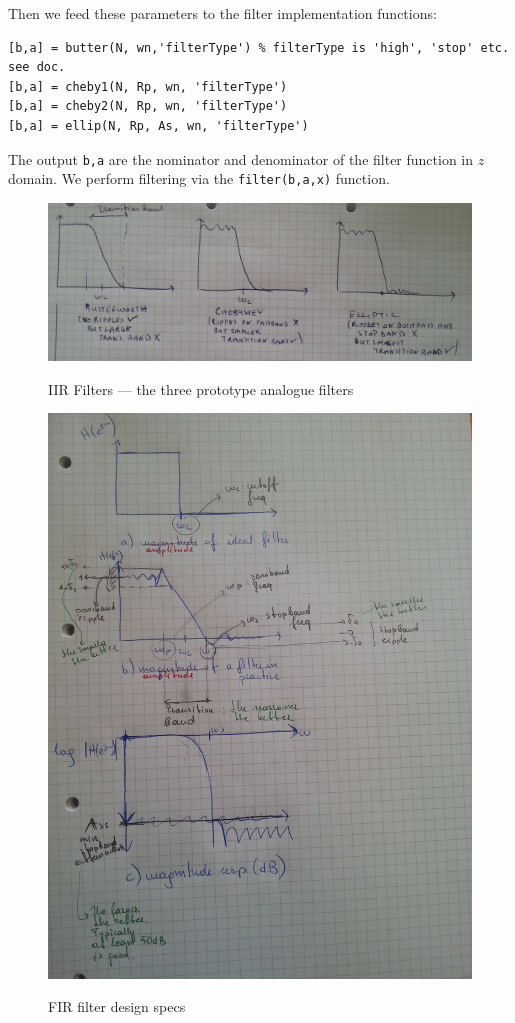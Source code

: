 \documentclass{article}
\newcommand{\ttt}[1]{\texttt{#1}}
\begin{document}
Then we feed these parameters to the filter implementation functions:
\begin{verbatim}
[b,a] = butter(N, wn,'filterType') % filterType is 'high', 'stop' etc. see doc.
[b,a] = cheby1(N, Rp, wn, 'filterType')
[b,a] = cheby2(N, Rp, wn, 'filterType')
[b,a] = ellip(N, Rp, As, wn, 'filterType')
\end{verbatim}

The output \ttt{b,a} are the nominator and denominator of the filter function in $z$ domain. We perform filtering via the \ttt{filter(b,a,x)} function.


\begin{figure}
\centering
\includegraphics[scale=0.13]{fig/iir_design.jpg}
\label{fig:iir}
\caption{IIR Filters \---- the three prototype analogue filters}
\end{figure}



\begin{figure}
\includegraphics[scale=0.20]{fig/fir_design.jpg}
\label{fig:design}
\caption{FIR filter design specs}
\end{figure}


\end{document}
